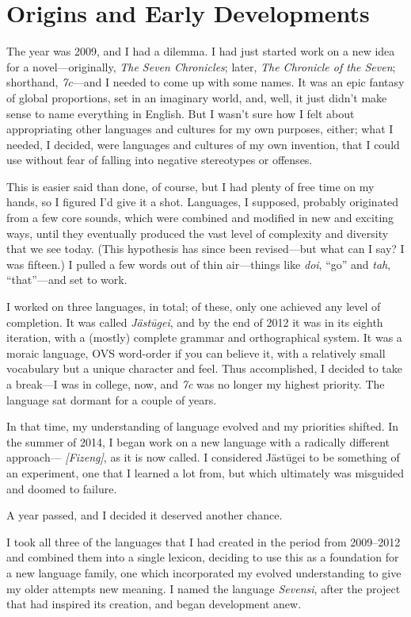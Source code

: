 \chapter{Origins and Early Developments}

The year was 2009, and I had a dilemma.
I had just started work on a new idea for a novel—originally, \emph{The Seven Chronicles}; later, \emph{The Chronicle of the Seven}; shorthand, \emph{7c}—and I needed to come up with some names.
It was an epic fantasy of global proportions, set in an imaginary world, and, well, it just didn't make sense to name everything in English.
But I wasn't sure how I felt about appropriating other languages and cultures for my own purposes, either; what I needed, I decided, were languages and cultures of my own invention, that I could use without fear of falling into negative stereotypes or offenses.

This is easier said than done, of course, but I had plenty of free time on my hands, so I figured I'd give it a shot.
Languages, I supposed, probably originated from a few core sounds, which were combined and modified in new and exciting ways, until they eventually produced the vast level of complexity and diversity that we see today.
(This hypothesis has since been revised—but what can I say? I was fifteen.)
I pulled a few words out of thin air—things like \emph{doi}, “go” and \emph{tah}, “that”—and set to work.

I worked on three languages, in total; of these, only one achieved any level of completion.
It was called \emph{Jästūgei}, and by the end of 2012 it was in its eighth iteration, with a (mostly) complete grammar and orthographical system.
It was a moraic language, OVS word-order if you can believe it, with a relatively small vocabulary but a unique character and feel.
Thus accomplished, I decided to take a break—I was in college, now, and \emph{7c} was no longer my highest priority.
The language sat dormant for a couple of years.

In that time, my understanding of language evolved and my priorities shifted.
In the summer of 2014, I began work on a new language with a radically different approach—\emph{ [Fizeng]}, as it is now called.
I considered Jästūgei to be something of an experiment, one that I learned a lot from, but which ultimately was misguided and doomed to failure.

A year passed, and I decided it deserved another chance.

I took all three of the languages that I had created in the period from 2009–2012 and combined them into a single lexicon, deciding to use this as a foundation for a new language family, one which incorporated my evolved understanding to give my older attempts new meaning.
I named the language \emph{Sevensi}, after the project that had inspired its creation, and began development anew.

